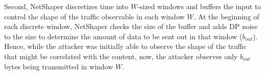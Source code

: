 Second, NetShaper discretizes time into $W$-sized windows and buffers the input to control the shape of the traffic observable in each window $W$.
At the beginning of each discrete window, NetShaper checks the size of the buffer and adds DP noise to the size to determine the amount of data to be sent out in that window ($b_{out}$).
Hence, while the attacker was initially able to observe the shape of the traffic that might be correlated with the content, now, the attacker observes only $b_{out}$ bytes being transmitted in window $W$.


\begin{comment}

Note: Should we add stuff about sensitivity? (I don't think it's necessary for my thesis)

So, initially, the attacker was able to query a function $f(S, t_{start}, t_{end})$ to obtain the amount of data transmitted between any given interval $t_{start} - t_{end}$. 
However, with the application of DP on the network stream, the attacker can now only query a new function $f_{DP}(S, t_{start}, t_{start} + W)$.
$f_{DP}$ is a differentially private function ensuring that the probability of leaking individual entries of the dataset is bounded.
NetShaper's defence relies on transmitting \#$f_{DP}$ bytes at every interval W, ensuring that the attacker only observes \#$f_{DP}$ bytes on the wire.

\end{comment}